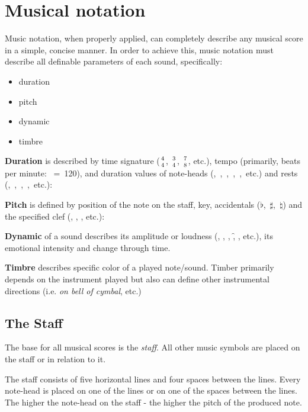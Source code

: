\chapter{Musical notation}\label{ch:music_notation}

Music notation, when properly applied, can completely describe any musical score in a simple, concise manner. In order
to achieve this, music notation must describe all definable parameters of each sound, specifically\cite{mcgrain1990music}:

\begin{itemize}
	\item duration
	\item pitch
	\item dynamic
	\item timbre
\end{itemize}

\textbf{Duration} is described by time signature ($4\atop4$, $3\atop4$, $7\atop8$, etc.), tempo (primarily, beats per
minute: \Vier~=~120), and duration values of note-heads (\Ganz,~\Halb,~\Vier,~\Acht,~\Sech,~etc.) and rests
(\GaPa,~\ViPa,~\AcPa,~\SePa,~etc.):

\figcenter{}


\textbf{Pitch} is defined by position of the note on the staff, key, accidentals ($\flat$,~$\sharp$,~$\natural$) and
the specified clef (\inlinemusic\smalltrebleclef, \inlinemusic\smallbassclef, \inlinemusic\smallaltoclef, etc.):

\figcenter{}


\textbf{Dynamic} of a sound describes its amplitude or loudness (\pp, \p, \mf, \f, \ff, etc.), its emotional intensity
and change through time.

\textbf{Timbre} describes specific color of a played note/sound. Timber primarily depends on the instrument played but
also can define other instrumental directions (i.e. \textit{on bell of cymbal}, etc.)


\section{The Staff}\label{sec:the_staff}
The base for all musical scores is the \textit{staff}. All other music symbols are placed on the staff or in relation
to it.

The staff consists of five horizontal lines and four spaces between the lines. Every note-head is placed on one of
the lines or on one of the spaces between the lines. The higher the note-head on the staff - the higher the pitch of
the produced note.

